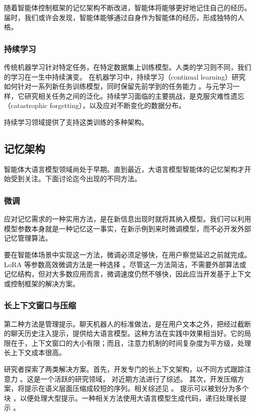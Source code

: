 随着智能体控制框架的记忆架构不断改进，智能体将能够更好地记住自己的经历。届时，我们或许会发现，智能体能够通过自身作为智能体的经历，形成独特的人格。

\subsubsection{持续学习}
传统机器学习针对特定任务，在特定数据集上训练模型。人类的学习则不同，我们的学习在一生中持续演变。
在机器学习中，持续学习（continual learning）研究如何针对一系列新任务训练模型，同时保留先前学到的任务能力 \citep{wang2024comprehensive,li2025improving}。与元学习一样，它研究相关任务之间的泛化。持续学习面临的主要挑战，是克服灾难性遗忘（catastrophic forgetting），以及应对不断变化的数据分布。

持续学习领域提供了支持这类训练的多种架构。



\subsection{记忆架构}
智能体大语言模型领域尚处于早期。直到最近，大语言模型智能体的记忆架构才开始受到关注。下面讨论迄今出现的不同方法。

\subsubsection{微调}
应对记忆需求的一种实用方法，是在新信息出现时就将其纳入模型。我们可以利用模型参数本身就是一种记忆这一事实，在新示例到来时微调模型，而不必开发外部记忆管理算法。

要在智能体场景中实现这一方法，微调必须足够快，在用户察觉延迟之前就完成。LoRA 等参数高效微调方法是一种选择 \citep{yang2024low}。尽管这一方法简洁，不需要外部算法或记忆结构，但对大多数应用而言，微调速度仍然不够快，因此应当开发基于上下文或控制框架的解决方案。

\subsubsection{长上下文窗口与压缩}
第二种方法是管理提示。聊天机器人的标准做法，是在用户文本之外，把经过截断的聊天历史注入提示，提供给大语言模型。这种方法在实践中效果相当好。它的局限在于，上下文窗口的大小有限；而且，注意力机制的时间复杂度为平方级，处理长上下文成本很高。

研究者探索了两类解决方案。首先，开发专门的长上下文架构，以不同方式跟踪注意力 \citep{smith2022simplified}。这是一个活跃的研究领域，\citet{liu2025comprehensive} 对近期方法进行了综述。
其次，开发压缩方案，将提示在语义层面压缩成较短的序列。相关综述见 \citet{li2025prompt}。
提示可以被划分为多个块 \citep{sheng2025dynamic}，以便处理大型提示。一种相关方法使用大语言模型生成代码，递归处理长提示 \citep{zhang2025recursive}。

